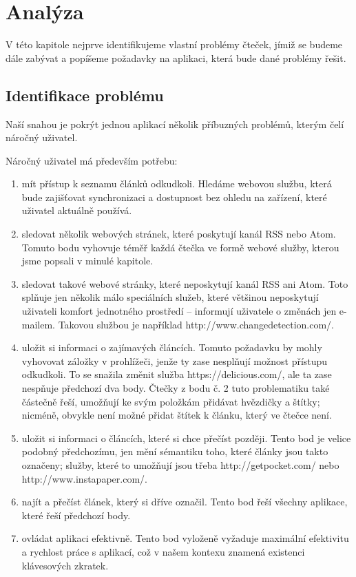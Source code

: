 \chapter{Analýza}

V této kapitole nejprve identifikujeme vlastní problémy čteček, jímiž se budeme dále zabývat a popíšeme požadavky na aplikaci, která bude dané problémy řešit.

\section{Identifikace problému}

Naší snahou je pokrýt jednou aplikací několik příbuzných problémů, kterým čelí náročný uživatel.

Náročný uživatel má především potřebu:
\begin{enumerate}
    \item mít přístup k seznamu článků odkudkoli.
        Hledáme webovou službu, která bude zajišťovat synchronizaci a dostupnost bez ohledu na zařízení, které uživatel aktuálně používá.
    \item sledovat několik webových stránek, které poskytují kanál RSS nebo Atom.
        Tomuto bodu vyhovuje téměř každá čtečka ve formě webové služby, kterou jsme popsali v minulé kapitole.
    \item sledovat takové webové stránky, které neposkytují kanál RSS ani Atom.
        Toto splňuje jen několik málo speciálních služeb, které většinou neposkytují uživateli komfort jednotného prostředí -- informují uživatele o změnách jen e-mailem.
		Takovou službou je například http://www.changedetection.com/.
    \item uložit si informaci o zajímavých článcích.
        Tomuto požadavku by mohly vyhovovat záložky v prohlížeči, jenže ty zase nesplňují možnost přístupu odkudkoli.
        To se snažila změnit služba https://delicious.com/, ale ta zase nespňuje předchozí dva body.
        Čtečky z bodu č. 2 tuto problematiku také částečně řeší, umožňují ke svým položkám přidávat hvězdičky a štítky; nicméně, obvykle není možné přidat štítek k článku, který ve čtečce není.
    \item uložit si informaci o článcích, které si chce přečíst později.
        Tento bod je velice podobný předchozímu, jen mění sémantiku toho, které články jsou takto označeny; služby, které to umožňují jsou třeba http://getpocket.com/ nebo http://www.instapaper.com/.
    \item najít a přečíst článek, který si dříve označil.
        Tento bod řeší všechny aplikace, které řeší předchozí body.
    \item ovládat aplikaci efektivně.
        Tento bod vyloženě vyžaduje maximální efektivitu a rychlost práce s aplikací, což v našem kontexu znamená existenci klávesových zkratek.
\end{enumerate}

